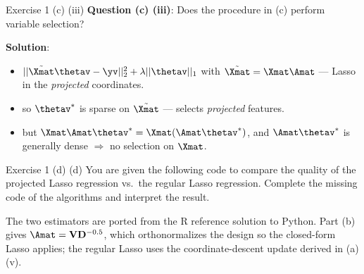 \documentclass[aspectratio=169]{beamer}
\newcommand{\Vmat}{\mathbf{V}}
\newcommand{\Dmat}{\mathbf{D}}
\begin{document}
\begin{frame}{Exercise 1 (c) (iii)}
	\textbf{Question (c) (iii)}: Does the procedure in (c) perform variable selection?
	\medskip

	\textbf{Solution}:
	\begin{itemize}
		\item<2-> $||\tilde{\Xmat}\thetav - \yv||_2^2 + \lambda||\thetav||_1$ with $\tilde{\Xmat}=\Xmat\Amat$ --- Lasso in the \emph{projected} coordinates.
		\item<3-> so $\thetav^*$ is sparse on $\tilde{\Xmat}$ --- selects \emph{projected} features.
		\item<4-> but $\Xmat\Amat\thetav^* = \Xmat(\Amat\thetav^*)$, and $\Amat\thetav^*$ is generally dense $\Rightarrow$ \colorbox{blue!10}{no selection on $\Xmat$}.
	\end{itemize}
	\medskip

\end{frame}

\begin{frame}{Exercise 1 (d)}
	(d) You are given the following code to compare the quality of the projected Lasso regression vs.\ the regular Lasso regression. Complete the missing code of the algorithms and interpret the result.
	\medskip

	The two estimators are ported from the R reference solution to Python. Part (b) gives $\Amat = \Vmat \Dmat^{-0.5}$, which orthonormalizes the design so the closed-form Lasso applies; the regular Lasso uses the coordinate-descent update derived in (a)(v).
\end{frame}
\end{document}
